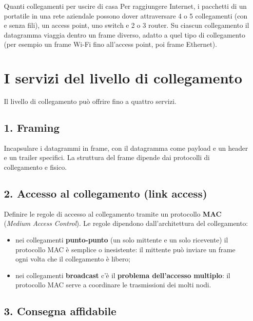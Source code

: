 \begin{esempio}{Quanti collegamenti per uscire di casa}
Per raggiungere Internet, i pacchetti di un portatile in una rete aziendale possono dover attraversare 4 o 5 collegamenti (con e
senza fili), un access point, uno switch e 2 o 3 router. Su ciascun collegamento il datagramma viaggia dentro un frame diverso,
adatto a quel tipo di collegamento (per esempio un frame Wi-Fi fino all'access point, poi frame Ethernet).
\end{esempio}

\section{I servizi del livello di collegamento}

Il livello di collegamento può offrire fino a quattro servizi.

\subsection{1. Framing}

Incapsulare i datagrammi in frame, con il datagramma come payload e un header e un trailer specifici. La struttura del frame dipende
dai protocolli di collegamento e fisico.

\subsection{2. Accesso al collegamento (link access)}

Definire le regole di accesso al collegamento tramite un protocollo \textbf{MAC} (\emph{Medium Access Control}). Le regole
dipendono dall'architettura del collegamento:

\begin{itemize}
    \item nei collegamenti \textbf{punto-punto} (un solo mittente e un solo ricevente) il protocollo MAC è semplice o inesistente:
          il mittente può inviare un frame ogni volta che il collegamento è libero;
    \item nei collegamenti \textbf{broadcast} c'è il \textbf{problema dell'accesso multiplo}: il protocollo MAC serve a coordinare le
          trasmissioni dei molti nodi.
\end{itemize}

\subsection{3. Consegna affidabile}

